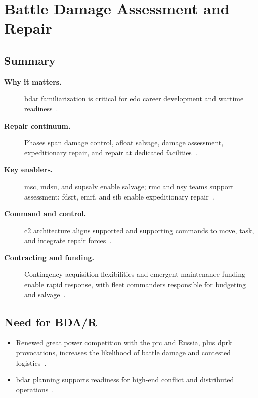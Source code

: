 \documentclass[../main.tex]{subfiles}
\begin{document}
\section{Battle Damage Assessment and Repair}

\subsection{Summary}
\begin{description}
  \item[\textbf{Why it matters.}] \ac{bdar} familiarization is critical for \ac{edo} career development and wartime readiness~\autocite{edo-4-1-6-bdar-2025}.
  \item[\textbf{Repair continuum.}] Phases span damage control, afloat salvage, damage assessment, expeditionary repair, and repair at dedicated facilities~\autocite{edo-4-1-6-bdar-2025}.
  \item[\textbf{Key enablers.}] \ac{msc}, \ac{mdsu}, and \ac{supsalv} enable salvage; \ac{rmc} and \ac{nsy} teams support assessment; \ac{fdsrt}, \ac{emrf}, and \ac{sib} enable expeditionary repair~\autocite{edo-4-1-6-bdar-2025}.
  \item[\textbf{Command and control.}] \ac{c2} architecture aligns supported and supporting commands to move, task, and integrate repair forces~\autocite{edo-4-1-6-bdar-2025}.
  \item[\textbf{Contracting and funding.}] Contingency acquisition flexibilities and emergent maintenance funding enable rapid response, with fleet commanders responsible for budgeting and salvage~\autocite{edo-4-1-6-bdar-2025}.
\end{description}

\subsection{Need for BDA/R}
\begin{itemize}
  \item Renewed great power competition with the \ac{prc} and Russia, plus \ac{dprk} provocations, increases the likelihood of battle damage and contested logistics~\autocite{edo-4-1-6-bdar-2025}.
  \item \ac{bdar} planning supports readiness for high-end conflict and distributed operations~\autocite{edo-4-1-6-bdar-2025}.
\end{itemize}
\end{document}
